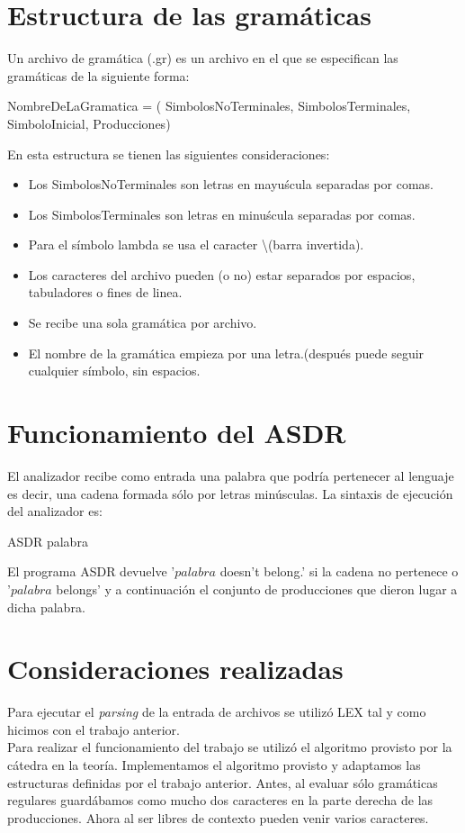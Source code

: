 \documentclass{article}
\begin{document}
\section{Estructura de las gram\'aticas}
Un archivo de gram\'atica (.gr) es un archivo en el que se especifican las gram\'aticas de la siguiente forma: 
\begin{center}
NombreDeLaGramatica = ( {SimbolosNoTerminales}, {SimbolosTerminales}, SimboloInicial, {Producciones})
\end{center}
En esta estructura se tienen las siguientes consideraciones:
\begin{itemize}
\item Los SimbolosNoTerminales son letras en mayu\'scula separadas por comas.
\item Los SimbolosTerminales son letras en minu\'scula separadas por comas.
\item Para el s\'imbolo lambda se usa el caracter \textbackslash (barra invertida).
\item Los caracteres del archivo pueden (o no) estar separados por espacios, tabuladores o fines de linea.
\item Se recibe una sola gram\'atica por archivo.
\item El nombre de la gram\'atica empieza por una letra.(despu\'es puede seguir cualquier s\'imbolo, sin espacios.
\end{itemize}

\section{Funcionamiento del ASDR}
El analizador recibe como entrada una palabra que podr\'ia pertenecer al lenguaje es decir, una cadena formada s\'olo por letras min\'usculas. La sintaxis de ejecuci\'on del analizador es: 
\begin{center}
ASDR palabra
\end{center}
El programa ASDR devuelve '$palabra$ doesn't belong.' si la cadena no pertenece o '$palabra$ belongs' y a continuaci\'on el conjunto de producciones que dieron lugar a dicha palabra.

\section{Consideraciones realizadas}
Para ejecutar el \textit{parsing} de la entrada de archivos se utiliz\'o LEX tal y como hicimos con el trabajo anterior.\\
Para realizar el funcionamiento del trabajo se utiliz\'o el algoritmo provisto por la c\'atedra en la teor\'ia. Implementamos el algoritmo provisto y adaptamos las estructuras definidas por el trabajo anterior. Antes, al evaluar s\'olo gram\'aticas regulares guard\'abamos como mucho dos caracteres en la parte derecha de las producciones. Ahora al ser libres de contexto pueden venir varios caracteres.
\end{document}
